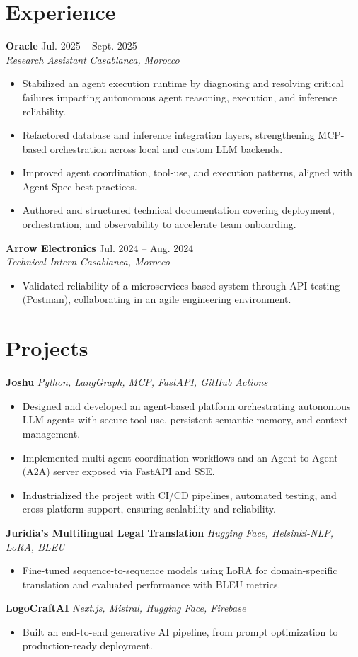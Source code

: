 \documentclass[11pt,a4paper]{article}
\newcommand{\resumeSubheading}[4]{
  \vspace{3pt}
  \noindent\textbf{#1} \hfill #2 \\
  \textit{#3} \hfill \textit{#4}
  \vspace{2pt}
}
\newcommand{\resumeProject}[2]{
  \vspace{3pt}
  \noindent\textbf{#1} \hfill \textit{#2}
  \vspace{2pt}
}
\begin{document}
\section{Experience}
\resumeSubheading{Oracle}{Jul. 2025 -- Sept. 2025}{Research Assistant}{Casablanca, Morocco}
\begin{itemize}
  \item Stabilized an agent execution runtime by diagnosing and resolving critical failures impacting autonomous agent reasoning, execution, and inference reliability.
  \item Refactored database and inference integration layers, strengthening MCP-based orchestration across local and custom LLM backends.
  \item Improved agent coordination, tool-use, and execution patterns, aligned with Agent Spec best practices.
  \item Authored and structured technical documentation covering deployment, orchestration, and observability to accelerate team onboarding.
\end{itemize}
\resumeSubheading{Arrow Electronics}{Jul. 2024 -- Aug. 2024}{Technical Intern}{Casablanca, Morocco}
\begin{itemize}
  \item Validated reliability of a microservices-based system through API testing (Postman), collaborating in an agile engineering environment.
\end{itemize}

\section{Projects}
\resumeProject{Joshu}{Python, LangGraph, MCP, FastAPI, GitHub Actions}
\begin{itemize}
  \item Designed and developed an agent-based platform orchestrating autonomous LLM agents with secure tool-use, persistent semantic memory, and context management.
  \item Implemented multi-agent coordination workflows and an Agent-to-Agent (A2A) server exposed via FastAPI and SSE.
  \item Industrialized the project with CI/CD pipelines, automated testing, and cross-platform support, ensuring scalability and reliability.
\end{itemize}
\resumeProject{Juridia's Multilingual Legal Translation}{Hugging Face, Helsinki-NLP, LoRA, BLEU}
\begin{itemize}
  \item Fine-tuned sequence-to-sequence models using LoRA for domain-specific translation and evaluated performance with BLEU metrics.
\end{itemize}
\resumeProject{LogoCraftAI}{Next.js, Mistral, Hugging Face, Firebase}
\begin{itemize}
  \item Built an end-to-end generative AI pipeline, from prompt optimization to production-ready deployment.
\end{itemize}
\end{document}
